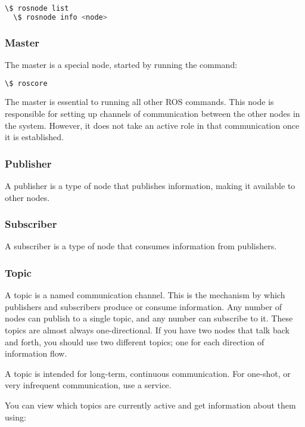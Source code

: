 \begin{lstlisting}[language=bash]
  \$ rosnode list
  \$ rosnode info <node>
\end{lstlisting}

\subsubsection{Master}

The master is a special node, started by running the command:

\begin{lstlisting}[language=bash]
  \$ roscore
\end{lstlisting}

The master is essential to running all other ROS commands. This node is responsible for setting up channels of communication between the other nodes in the system. However, it does not take an active role in that communication once it is established.

\subsubsection{Publisher}

A publisher is a type of node that publishes information, making it available to other nodes.

\subsubsection{Subscriber}

A subscriber is a type of node that consumes information from publishers.

\subsubsection{Topic}

A topic is a named communication channel. This is the mechanism by which publishers and subscribers produce or consume information. Any number of nodes can publish to a single topic, and any number can subscribe to it. These topics are almost always one-directional. If you have two nodes that talk back and forth, you should use two different topics; one for each direction of information flow.

A topic is intended for long-term, continuous communication. For one-shot, or very infrequent communication, use a service.

You can view which topics are currently active and get information about them using:

